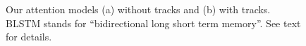 \begin{figure}[t!]
\begin{center}

\end{center}
   \caption{Our attention models (a) without tracks and (b) with tracks.
BLSTM stands for ``bidirectional long short term memory''.
See text for details.
}
\label{fig:model}
\end{figure}



